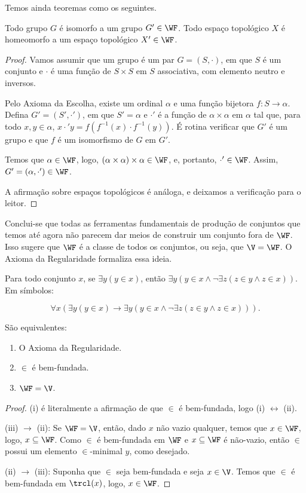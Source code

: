 Temos ainda teoremas como os seguintes.
\begin{theorem}[$\ZFCm$]
    Todo grupo $G$ é isomorfo a um grupo $G'\in \WF$.
    Todo espaço topológico $X$ é homeomorfo a um espaço topológico $X'\in \WF$.
\end{theorem}
\begin{proof}
    Vamos assumir que um grupo é um par $G=(S, \cdot)$, em que $S$ é um conjunto e $\cdot$ é uma função de $S\times S$ em $S$ associativa, com elemento neutro e inversos.

    Pelo Axioma da Escolha, existe um ordinal $\alpha$ e uma função bijetora $f: S \to \alpha$.
    Defina $G'=(S', \cdot')$, em que $S'=\alpha$ e $\cdot'$ é a função de $\alpha\times \alpha$ em $\alpha$ tal que, para todo $x, y\in \alpha$, $x\cdot' y=f(f^{-1}(x)\cdot f^{-1}(y))$.
    É rotina verificar que $G'$ é um grupo e que $f$ é um isomorfismo de $G$ em $G'$.

    Temos que $\alpha \in \WF$, logo, $(\alpha\times \alpha)\times \alpha\in \WF$, e, portanto, $\cdot'\in \WF$.
    Assim, $G'=(\alpha, \cdot')\in \WF$.

    A afirmação sobre espaços topológicos é análoga, e deixamos a verificação para o leitor.
\end{proof}

Conclui-se que todas as ferramentas fundamentais de produção de conjuntos que temos até agora não parecem dar meios de construir um conjunto fora de $\WF$.
Isso sugere que $\WF$ é a classe de todos os conjuntos, ou seja, que $\V=\WF$.
O Axioma da Regularidade formaliza essa ideia.

\begin{axiom}
    Para todo conjunto $x$, se $\exists y(y\in x)$, então $\exists y(y\in x \wedge \neg\exists z(z\in y \wedge z\in x))$.
    Em símbolos:

    \[
        \forall x(\exists y(y\in x)\rightarrow \exists y(y\in x \wedge \neg\exists z(z\in y \wedge z\in x))).
    \]
\end{axiom}

\begin{proposition}[$\ZFmP$]São equivalentes:
    \begin{enumerate}[label=(\roman*)]
        \item O Axioma da Regularidade.
        \item $\in$ é bem-fundada.
        \item $\WF=\V$.
    \end{enumerate}
\end{proposition}
\begin{proof}
    (i) é literalmente a afirmação de que $\in$ é bem-fundada, logo (i) $\leftrightarrow$ (ii).

    (iii) $\rightarrow$ (ii): Se $\WF=\V$, então, dado $x$ não vazio qualquer, temos que $x\in \WF$, logo, $x\subseteq \WF$.
    Como $\in$ é bem-fundada em $\WF$ e $x\subseteq \WF$ é não-vazio, então $\in$ possui um elemento $\in$-minimal $y$, como desejado.

    (ii) $\rightarrow$ (iii): Suponha que $\in$ seja bem-fundada e seja $x\in \V$.
    Temos que $\in$ é bem-fundada em $\trcl(x)$, logo, $x \in \WF$.
\end{proof}